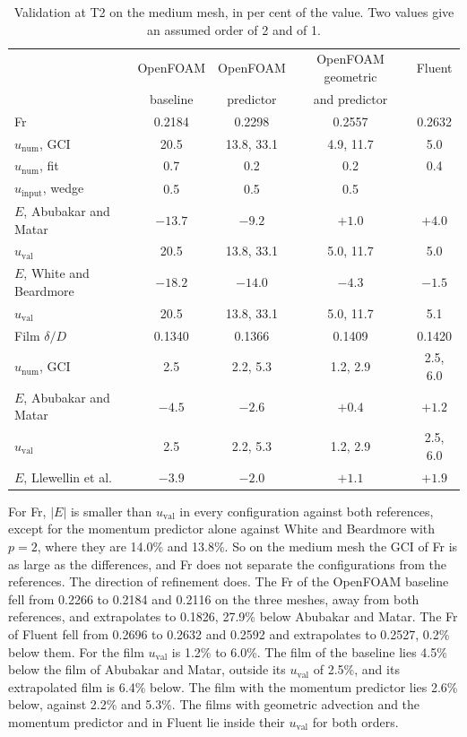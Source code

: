 \documentclass[11pt,a4paper]{article}
\begin{document}
\begin{table}[H]
\centering
\small
\caption{Validation at T2 on the medium mesh, in per cent of the value. Two values give an assumed order of 2 and of 1.}
\label{tab:budget}
\setlength{\tabcolsep}{4pt}
\begin{tabular}{lcccc}
\toprule
 & OpenFOAM & OpenFOAM & OpenFOAM geometric & Fluent \\
 & baseline & predictor & and predictor & \\
\midrule
Fr & 0.2184 & 0.2298 & 0.2557 & 0.2632 \\
$u_\mathrm{num}$, GCI & 20.5 & 13.8, 33.1 & 4.9, 11.7 & 5.0 \\
$u_\mathrm{num}$, fit & 0.7 & 0.2 & 0.2 & 0.4 \\
$u_\mathrm{input}$, wedge & 0.5 & 0.5 & 0.5 & \\
$E$, Abubakar and Matar & $-13.7$ & $-9.2$ & $+1.0$ & $+4.0$ \\
$u_\mathrm{val}$ & 20.5 & 13.8, 33.1 & 5.0, 11.7 & 5.0 \\
$E$, White and Beardmore & $-18.2$ & $-14.0$ & $-4.3$ & $-1.5$ \\
$u_\mathrm{val}$ & 20.5 & 13.8, 33.1 & 5.0, 11.7 & 5.1 \\
\midrule
Film $\delta/D$ & 0.1340 & 0.1366 & 0.1409 & 0.1420 \\
$u_\mathrm{num}$, GCI & 2.5 & 2.2, 5.3 & 1.2, 2.9 & 2.5, 6.0 \\
$E$, Abubakar and Matar & $-4.5$ & $-2.6$ & $+0.4$ & $+1.2$ \\
$u_\mathrm{val}$ & 2.5 & 2.2, 5.3 & 1.2, 2.9 & 2.5, 6.0 \\
$E$, Llewellin et al. & $-3.9$ & $-2.0$ & $+1.1$ & $+1.9$ \\
\bottomrule
\end{tabular}
\end{table}

For Fr, $|E|$ is smaller than $u_\mathrm{val}$ in every configuration against both references, except for the momentum predictor alone against White and Beardmore with $p = 2$, where they are 14.0\% and 13.8\%. So on the medium mesh the GCI of Fr is as large as the differences, and Fr does not separate the configurations from the references. The direction of refinement does. The Fr of the OpenFOAM baseline fell from 0.2266 to 0.2184 and 0.2116 on the three meshes, away from both references, and extrapolates to 0.1826, 27.9\% below Abubakar and Matar. The Fr of Fluent fell from 0.2696 to 0.2632 and 0.2592 and extrapolates to 0.2527, 0.2\% below them. For the film $u_\mathrm{val}$ is 1.2\% to 6.0\%. The film of the baseline lies 4.5\% below the film of Abubakar and Matar, outside its $u_\mathrm{val}$ of 2.5\%, and its extrapolated film is 6.4\% below. The film with the momentum predictor lies 2.6\% below, against 2.2\% and 5.3\%. The films with geometric advection and the momentum predictor and in Fluent lie inside their $u_\mathrm{val}$ for both orders.
\end{document}
